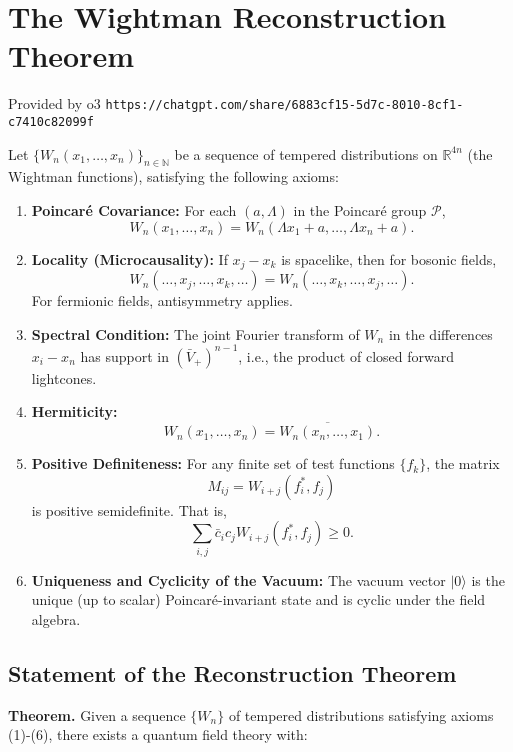 \documentclass{article}
\newcommand{\1}{\mathbbm{1}}
\theoremstyle{plain}
\theoremstyle{definition}
\numberwithin{equation}{section}
\begin{document}
\section{The Wightman Reconstruction Theorem}
\label{s:wrt2}

Provided by o3 {\tt https://chatgpt.com/share/6883cf15-5d7c-8010-8cf1-c7410c82099f}

Let $\{ W_n(x_1, \dots, x_n) \}_{n \in \mathbb{N}}$ be a sequence of tempered distributions on $\mathbb{R}^{4n}$ (the Wightman functions), satisfying the following axioms:

\begin{enumerate}
  \item \textbf{Poincaré Covariance:} For each $(a, \Lambda)$ in the Poincaré group $\mathcal{P}$,
  \[
  W_n(x_1, \dots, x_n) = W_n(\Lambda x_1 + a, \dots, \Lambda x_n + a).
  \]
  
  \item \textbf{Locality (Microcausality):} If $x_j - x_k$ is spacelike, then for bosonic fields,
  \[
  W_n(\dots, x_j, \dots, x_k, \dots) = W_n(\dots, x_k, \dots, x_j, \dots).
  \]
  For fermionic fields, antisymmetry applies.
  
  \item \textbf{Spectral Condition:} The joint Fourier transform of $W_n$ in the differences $x_i - x_n$ has support in $(\bar{V}_+)^{n-1}$, i.e., the product of closed forward lightcones.
  
  \item \textbf{Hermiticity:} 
  \[
  W_n(x_1, \dots, x_n) = \overline{W_n(x_n, \dots, x_1)}.
  \]
  
  \item \textbf{Positive Definiteness:} For any finite set of test functions $\{ f_k \}$, the matrix
  \[
  M_{ij} = W_{i+j}(f_i^*, f_j)
  \]
  is positive semidefinite. That is,
  \[
  \sum_{i,j} \bar{c}_i c_j W_{i+j}(f_i^*, f_j) \geq 0.
  \]
  
  \item \textbf{Uniqueness and Cyclicity of the Vacuum:} The vacuum vector $|0\rangle$ is the unique (up to scalar) Poincaré-invariant state and is cyclic under the field algebra.
\end{enumerate}

\subsection{Statement of the Reconstruction Theorem}

\textbf{Theorem.} Given a sequence $\{ W_n \}$ of tempered distributions satisfying axioms (1)-(6), there exists a quantum field theory with:
\end{document}
